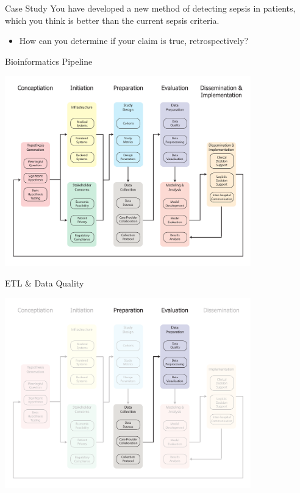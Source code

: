 \documentclass[10pt, xcolor=table]{beamer}
\begin{document}
\begin{frame}{Case Study}
You have developed a new method of detecting sepsis in patients, which you think is better than the current sepsis criteria.
	\begin{itemize}
		\item How can you determine if your claim is true, retrospectively?
		
	\end{itemize}
\end{frame}


\begin{frame}{Bioinformatics Pipeline}
	\begin{center}
		\includegraphics[width=0.8\textwidth]{images/informatics_pipeline.pdf}	
	\end{center}
\end{frame}


\begin{frame}{ETL \& Data Quality}
	\begin{center}
		\includegraphics[width=0.8\textwidth]{images/informatics_pipeline_etl_data_quality.pdf}
	\end{center}
\end{frame}
\end{document}
